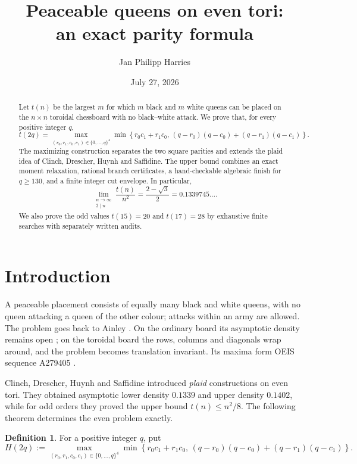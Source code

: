 \documentclass[11pt]{amsart}
\title[Peaceable queens on even tori]{Peaceable queens on even tori:\\an exact parity formula}
\author{Jan Philipp Harries}
\date{July 27, 2026}
\theoremstyle{definition}
\newtheorem{definition}[theorem]{Definition}
\theoremstyle{remark}
\begin{document}
\begin{abstract}
Let $t(n)$ be the largest $m$ for which $m$ black and $m$ white queens can be placed on the $n\times n$ toroidal chessboard with no black--white attack. We prove that, for every positive integer $q$,
\[
t(2q)=
\max_{(r_0,r_1,c_0,c_1)\in\{0,\ldots,q\}^4}
\min\!\left\{r_0c_1+r_1c_0,\,
(q-r_0)(q-c_0)+(q-r_1)(q-c_1)\right\}.
\]
The maximizing construction separates the two square parities and extends the
plaid idea of Clinch, Drescher, Huynh and Saffidine.  The upper bound combines
an exact moment relaxation, rational branch certificates, a hand-checkable
algebraic finish for $q\ge130$, and a finite integer cut envelope.  In
particular,
\[
\lim_{\substack{n\to\infty\\2\mid n}}\frac{t(n)}{n^2}
=\frac{2-\sqrt3}{2}=0.1339745\ldots .
\]
We also prove the odd values $t(15)=20$ and $t(17)=28$ by exhaustive finite
searches with separately written audits.
\end{abstract}

\maketitle

\section{Introduction}\label{sec:intro}

A peaceable placement consists of equally many black and white queens, with no
queen attacking a queen of the other colour; attacks within an army are
allowed.  The problem goes back to Ainley \cite{Ainley77}.  On the ordinary
board its asymptotic density remains open \cite{CDHS25}; on the toroidal board
the rows, columns and diagonals wrap around, and the problem becomes
translation invariant.  Its maxima form OEIS sequence A279405
\cite{OEIS279405}.

Clinch, Drescher, Huynh and Saffidine \cite{CDHS25,CDHS24} introduced
\emph{plaid} constructions on even tori.  They obtained asymptotic lower
density $0.1339$ and upper density $0.1402$, while for odd orders they proved
the upper bound $t(n)\le n^2/8$.  The following theorem determines the even
problem exactly.

\begin{definition}\label{def:H}
For a positive integer $q$, put
\begin{equation}\label{eq:Hdef}
H(2q):=
\max_{(r_0,r_1,c_0,c_1)\in\{0,\ldots,q\}^4}
\min\!\left\{r_0c_1+r_1c_0,\,
(q-r_0)(q-c_0)+(q-r_1)(q-c_1)\right\}.
\end{equation}
\end{definition}
\end{document}

